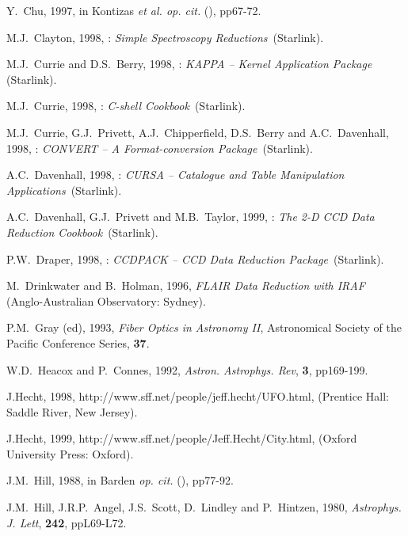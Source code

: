\documentclass[twoside,11pt]{starlink}
\begin{document}
\begin{thebibliography}{99}
   Y.~Chu, 1997, in Kontizas \textit{et al. op. cit.}\/
   (\cite{KONTIZAS97}), pp67-72.

   M.J.~Clayton, 1998, : \textit{Simple
   Spectroscopy Reductions}\, (Starlink).

   M.J.~Currie and D.S.~Berry, 1998, :
   \textit{KAPPA -- Kernel Application Package}\, (Starlink).

   M.J.~Currie, 1998, : \textit{C-shell
   Cookbook}\, (Starlink).

   M.J.~Currie, G.J.~Privett, A.J.~Chipperfield,
   D.S.~Berry and A.C.~Davenhall, 1998, :
   \textit{CONVERT -- A Format-conversion Package}\, (Starlink).

   A.C.~Davenhall, 1998, :
   \textit{CURSA -- Catalogue and Table Manipulation Applications}\, (Starlink).

   A.C.~Davenhall, G.J.~Privett and M.B.~Taylor, 1999,
   : \textit{The 2-D CCD Data Reduction Cookbook}\,
   (Starlink).

   P.W.~Draper, 1998, : \textit{CCDPACK -- CCD Data Reduction Package}\, (Starlink).

   M.~Drinkwater and B.~Holman, 1996, \textit{FLAIR Data
   Reduction with IRAF}\, (Anglo-Australian Observatory: Sydney).

   P.M.~Gray (ed), 1993, \textit{Fiber Optics in Astronomy
   II}, Astronomical Society of the Pacific Conference Series,
   \textbf{37}.

   W.D.~Heacox and P.~Connes, 1992, \textit{Astron.
   Astrophys. Rev}, \textbf{3}, pp169-199.

   J.Hecht, 1998,
   {http://www.sff.net/people/jeff.hecht/UFO.html},
   (Prentice Hall: Saddle River, New Jersey).

   J.Hecht, 1999,
   {http://www.sff.net/people/Jeff.Hecht/City.html},
   (Oxford University Press: Oxford).

   J.M.~Hill, 1988, in Barden \textit{op. cit.}\/
   (\cite{BARDEN88}), pp77-92.

   J.M.~Hill, J.R.P.~Angel, J.S.~Scott, D.~Lindley and
   P.~Hintzen, 1980, \textit{Astrophys. J. Lett}, \textbf{242}, ppL69-L72.


\end{thebibliography}
\end{document}
